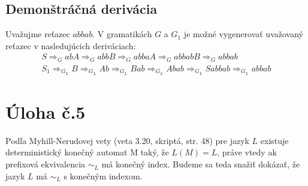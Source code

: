 \documentclass[10pt]{article}
\begin{document}
\subsection*{Demonštráčná derivácia}
Uvažujme reťazec $abbab$. V gramatikách $G$ a $G_1$ je možné vygenerovať uvažovaný reťazec v
nasledujúcich deriváciach:
\begin{align*}
    S \Rightarrow_G abA \Rightarrow_G abbB \Rightarrow_G abbaA \Rightarrow_G abbabB \Rightarrow_G
    abbab\\
    S_1 \Rightarrow_{G_L} B \Rightarrow_{G_L} Ab \Rightarrow_{G_L} Bab \Rightarrow_{G_L} Abab \Rightarrow_{G_L} Sabbab \Rightarrow_{G_L} abbab
\end{align*}


\section*{Úloha č.5}
Podľa Myhill-Nerudovej vety (veta 3.20, skriptá, str. 48) pre jazyk $L$ existuje deterministický konečný automat M taký, že $L(M)
= L$, práve vtedy ak prefixová ekvivalencia $\sim_L$ má konečný index. Budeme sa teda snažiť
dokázať, že jazyk $L$ má $\sim_L$ s konečným indexom.
\end{document}
